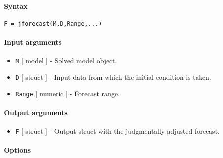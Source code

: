 


	\paragraph{Syntax}

\begin{verbatim}
F = jforecast(M,D,Range,...)
\end{verbatim}

\paragraph{Input arguments}

\begin{itemize}
\item
  \texttt{M} {[} model {]} - Solved model object.
\item
  \texttt{D} {[} struct {]} - Input data from which the initial
  condition is taken.
\item
  \texttt{Range} {[} numeric {]} - Forecast range.
\end{itemize}

\paragraph{Output arguments}

\begin{itemize}
\itemsep1pt\parskip0pt
\item
  \texttt{F} {[} struct {]} - Output struct with the judgmentally
  adjusted forecast.
\end{itemize}

\paragraph{Options}

